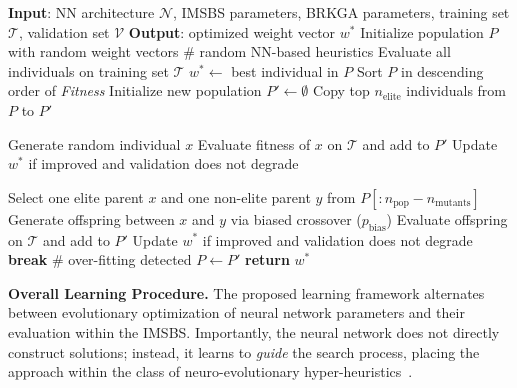 \documentclass[runningheads]{llncs}
\begin{document}
\begin{algorithm}[!ht]
	\caption{GA-Based Learning of a Beam Search Heuristic} \label{alg:learning_mechanism}
	\begin{algorithmic}[1]
		\STATE \textbf{Input}: NN architecture $\mathcal{N}$, IMSBS parameters, BRKGA parameters, training set $\mathcal{T}$, validation set $\mathcal{V}$
		\STATE \textbf{Output}: optimized weight vector $w^\ast$
		\STATE Initialize population $P$ with random weight vectors \# random NN-based heuristics
		\STATE Evaluate all individuals on training set $\mathcal{T}$
		\STATE $w^\ast \leftarrow$ best individual in $P$
		\STATE Sort $P$ in descending order of \emph{Fitness}
		\STATE Initialize new population $P' \gets \emptyset$
		\STATE Copy top $n_{\text{elite}}$ individuals from $P$ to $P'$
		
		\STATE Generate random individual $x$
		\STATE Evaluate fitness of $x$ on $\mathcal{T}$ and add to $P'$
		\STATE Update $w^\ast$ if improved and validation does not degrade
		\ENDFOR
		
		\STATE  Select one elite parent $x$ and one non-elite parent $y$ from $P[:n_{\textrm{pop}} - n_{\textrm{mutants}}]$
		\STATE Generate offspring between $x$ and $y$ via biased crossover ($p_{\text{bias}}$)
		\STATE Evaluate offspring on $\mathcal{T}$ and add to $P'$
		\STATE Update $w^\ast$ if improved and validation does not degrade
		\ENDFOR
		    \STATE \textbf{break} \# over-fitting detected
		\ENDIF
		\STATE $P \leftarrow P'$
		\ENDWHILE
		\STATE \textbf{return} $w^\ast$
	\end{algorithmic}
\end{algorithm}


 \textbf{Overall Learning Procedure.}
 The proposed learning framework alternates between evolutionary optimization of neural network parameters and their evaluation within the IMSBS. Importantly, the neural network does not directly construct solutions; instead, it learns to \emph{guide} the search process, placing the approach within the class of neuro-evolutionary hyper-heuristics~\cite{elsaid2019ant,ortiz2016neuro,galvan2021neuroevolution}.
 
\end{document}
